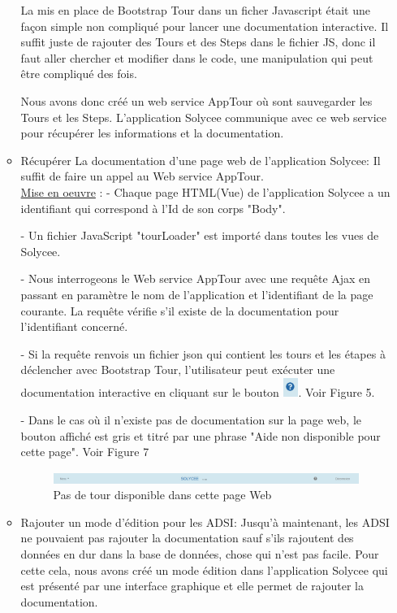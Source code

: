 \documentclass[12pt]{article}
\begin{document}
\begin{enumerate}
\begin{itemize}
La mis en place de Bootstrap Tour dans un ficher Javascript était une façon simple non compliqué pour lancer une documentation interactive. Il suffit juste de rajouter des Tours et des Steps dans le fichier JS, donc il faut aller chercher et modifier dans le code, une manipulation qui peut être compliqué des fois.

Nous avons donc créé un web service AppTour où sont sauvegarder les Tours et les Steps. L'application Solycee communique avec ce web service pour récupérer les informations et la documentation. \\ 

\item Récupérer La documentation d'une page web de l'application Solycee: Il suffit de faire un appel au Web service AppTour. \\   
 
\underline{Mise en oeuvre} :
- Chaque page HTML(Vue) de l'application Solycee a un identifiant qui correspond à l'Id de son corps "Body".

- Un fichier JavaScript "tourLoader" est importé dans toutes les vues de Solycee.

- Nous interrogeons le Web service AppTour avec une requête Ajax en passant en paramètre le nom de l'application et l'identifiant de la page courante. La requête vérifie s'il existe de la documentation pour l’identifiant concerné. 

- Si la requête renvois un fichier json qui contient les tours et les étapes à déclencher avec Bootstrap Tour, l'utilisateur peut exécuter une documentation interactive en cliquant sur le bouton \includegraphics[width=5mm,scale=0.5]{diagrammes/Bouton_aideDispo.png}. Voir Figure 5.    

- Dans le cas où il n'existe pas de documentation sur la page web, le bouton affiché est gris et titré par une phrase "Aide non disponible pour cette page". Voir Figure 7 \\
\begin{figure}[H]
	\centering
 		\includegraphics[width=1\textwidth]{diagrammes/aideNonDispo.png} 
  		\caption{Pas de tour disponible dans cette page Web }
	\end{figure}
    
\item Rajouter un mode d'édition pour les ADSI: Jusqu'à maintenant, les ADSI ne pouvaient pas rajouter la documentation sauf s'ils rajoutent des données en dur dans la base de données, chose qui n'est pas facile. Pour cette cela, nous avons créé un mode édition dans l'application Solycee qui est présenté par une interface graphique et elle  permet de rajouter la documentation.\\



\end{itemize}
\end{enumerate}
\end{document}

